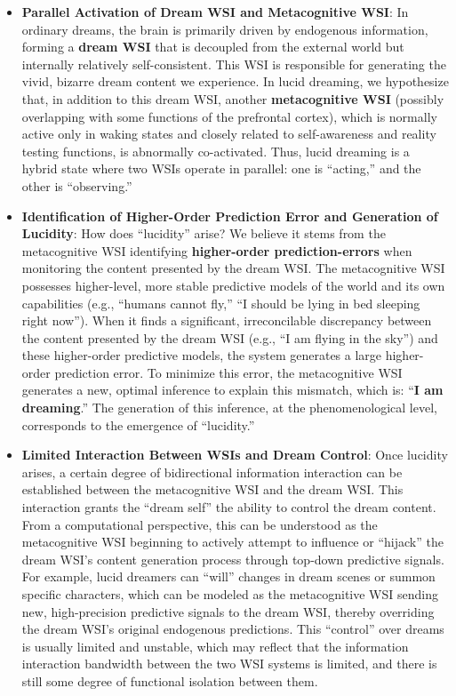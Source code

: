 \documentclass[
  a4paper]{article}
\begin{document}
\begin{itemize}
\item
  \textbf{Parallel Activation of Dream WSI and Metacognitive WSI}: In
  ordinary dreams, the brain is primarily driven by endogenous
  information, forming a \textbf{dream WSI} that is decoupled from the
  external world but internally relatively self-consistent. This WSI is
  responsible for generating the vivid, bizarre dream content we
  experience. In lucid dreaming, we hypothesize that, in addition to
  this dream WSI, another \textbf{metacognitive WSI} (possibly
  overlapping with some functions of the prefrontal cortex), which is
  normally active only in waking states and closely related to
  self-awareness and reality testing functions, is abnormally
  co-activated. Thus, lucid dreaming is a hybrid state where two WSIs
  operate in parallel: one is ``acting,'' and the other is
  ``observing.''
\item
  \textbf{Identification of Higher-Order Prediction Error and Generation
  of Lucidity}: How does ``lucidity'' arise? We believe it stems from
  the metacognitive WSI identifying \textbf{higher-order
  prediction-errors} when monitoring the content presented by the dream
  WSI. The
  metacognitive WSI possesses higher-level, more stable predictive
  models of the world and its own capabilities (e.g., ``humans cannot
  fly,'' ``I should be lying in bed sleeping right now''). When it finds
  a significant, irreconcilable discrepancy between the content
  presented by the dream WSI (e.g., ``I am flying in the sky'') and
  these higher-order predictive models, the system generates a large
  higher-order prediction error. To minimize this error, the
  metacognitive WSI generates a new, optimal inference to explain this
  mismatch, which is: ``\textbf{I am dreaming}.'' The generation of this
  inference, at the phenomenological level, corresponds to the emergence
  of ``lucidity.''
\item
  \textbf{Limited Interaction Between WSIs and Dream Control}: Once
  lucidity arises, a certain degree of bidirectional information
  interaction can be established between the metacognitive WSI and the
  dream WSI. This interaction grants the ``dream self'' the ability to
  control the dream content. From a computational perspective, this can
  be understood as the metacognitive WSI beginning to actively attempt
  to influence or ``hijack'' the dream WSI's content generation process
  through top-down predictive signals. For example, lucid dreamers can
  ``will'' changes in dream scenes or summon specific characters, which
  can be modeled as the metacognitive WSI sending new, high-precision
  predictive signals to the dream WSI, thereby overriding the dream
  WSI's original endogenous predictions. This ``control'' over dreams is
  usually limited and unstable, which may reflect that the information
  interaction bandwidth between the two WSI systems is limited, and
  there is still some degree of functional isolation between them.
\end{itemize}
\end{document}
